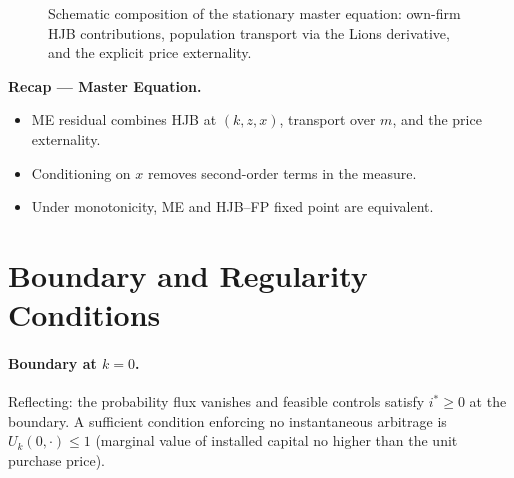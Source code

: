 \documentclass[11pt,letterpaper,oneside]{article}
\numberwithin{equation}{section}
\newcommand{\1}{\mathbf{1}}
\begin{document}
\begin{figure}[ht]
\centering
{}
\caption{Schematic composition of the stationary master equation: own-firm HJB contributions, population transport via the Lions derivative, and the explicit price externality.}
\end{figure}

\begin{tcolorbox}[didacticstyle]
\textbf{Recap — Master Equation.}
\begin{itemize}[leftmargin=1.15em,itemsep=0.2em]
  \item ME residual combines HJB at $(k,z,x)$, transport over $m$, and the price externality.
  \item Conditioning on $x$ removes second-order terms in the measure.
  \item Under monotonicity, ME and HJB--FP fixed point are equivalent.
\end{itemize}
\end{tcolorbox}

\section{Boundary and Regularity Conditions}

\paragraph{Boundary at $k=0$.} Reflecting: the probability flux vanishes and feasible controls satisfy $i^*\ge 0$ at the boundary. A sufficient condition enforcing no instantaneous arbitrage is $U_k(0,\cdot)\le 1$ (marginal value of installed capital no higher than the unit purchase price).
\end{document}
